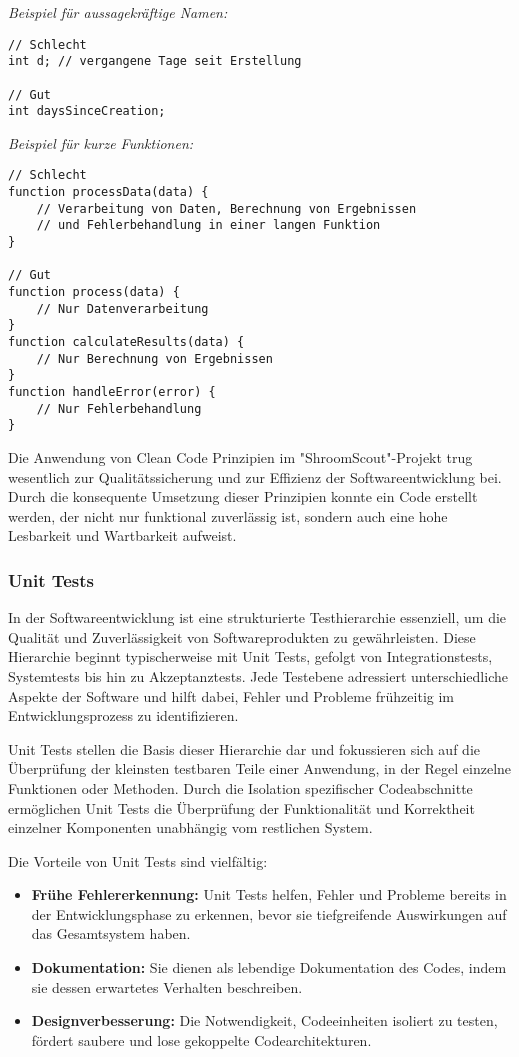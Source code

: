 \documentclass[../main.tex]{subfiles}
\begin{document}
\textit{Beispiel für aussagekräftige Namen:}
\begin{verbatim}
// Schlecht
int d; // vergangene Tage seit Erstellung

// Gut
int daysSinceCreation;
\end{verbatim}

\textit{Beispiel für kurze Funktionen:}
\begin{verbatim}
// Schlecht
function processData(data) {
    // Verarbeitung von Daten, Berechnung von Ergebnissen
    // und Fehlerbehandlung in einer langen Funktion
}

// Gut
function process(data) {
    // Nur Datenverarbeitung
}
function calculateResults(data) {
    // Nur Berechnung von Ergebnissen
}
function handleError(error) {
    // Nur Fehlerbehandlung
}
\end{verbatim}

Die Anwendung von Clean Code Prinzipien im "ShroomScout"-Projekt trug wesentlich zur Qualitätssicherung und zur Effizienz der Softwareentwicklung bei. Durch die 
konsequente Umsetzung dieser Prinzipien konnte ein Code erstellt werden, der nicht nur funktional zuverlässig ist, sondern auch eine hohe Lesbarkeit und Wartbarkeit 
aufweist.

\subsubsection{Unit Tests}
In der Softwareentwicklung ist eine strukturierte Testhierarchie essenziell, um die Qualität und Zuverlässigkeit von Softwareprodukten zu gewährleisten. Diese Hierarchie 
beginnt typischerweise mit Unit Tests, gefolgt von Integrationstests, Systemtests bis hin zu Akzeptanztests. Jede Testebene adressiert unterschiedliche Aspekte der Software 
und hilft dabei, Fehler und Probleme frühzeitig im Entwicklungsprozess zu identifizieren.

Unit Tests stellen die Basis dieser Hierarchie dar und fokussieren sich auf die Überprüfung der kleinsten testbaren Teile einer Anwendung, in der Regel einzelne Funktionen 
oder Methoden. Durch die Isolation spezifischer Codeabschnitte ermöglichen Unit Tests die Überprüfung der Funktionalität und Korrektheit einzelner Komponenten unabhängig 
vom restlichen System. 

Die Vorteile von Unit Tests sind vielfältig:
\begin{itemize}
  \item \textbf{Frühe Fehlererkennung:} Unit Tests helfen, Fehler und Probleme bereits in der Entwicklungsphase zu erkennen, bevor sie tiefgreifende Auswirkungen auf das 
  Gesamtsystem haben.
  \item \textbf{Dokumentation:} Sie dienen als lebendige Dokumentation des Codes, indem sie dessen erwartetes Verhalten beschreiben.
  \item \textbf{Designverbesserung:} Die Notwendigkeit, Codeeinheiten isoliert zu testen, fördert saubere und lose gekoppelte Codearchitekturen.
\end{itemize}
\end{document}
